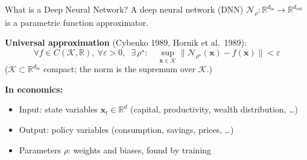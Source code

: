 \documentclass[aspectratio=169,11pt]{beamer}
\newcommand{\emphc}[1]{\textcolor{harvardcrimson}{#1}}
\newcommand{\x}{\bm{x}}
\newcommand{\R}{\mathbb{R}}
\begin{document}
\begin{frame}{What is a Deep Neural Network?}
A deep neural network (DNN) $\mathcal{N}_\rho : \R^{d_{\text{in}}} \to \R^{d_{\text{out}}}$ is a \emphc{parametric function approximator}.

\vspace{0.5em}
\textbf{Universal approximation} (Cybenko 1989, Hornik et al.\ 1989):
\[
\forall f \in C(\mathcal{K},\R),\ \forall\varepsilon > 0,\;\; \exists\, \rho^\star : \quad \sup_{\x\in\mathcal{K}}\bigl\|\mathcal{N}_{\rho^\star}(\x) - f(\x)\bigr\| < \varepsilon
\]
{\scriptsize ($\mathcal{K}\subset\R^{d_{\mathrm{in}}}$ compact; the norm is the supremum over $\mathcal{K}$.)}

\vspace{0.5em}
\textbf{In economics:}
\begin{itemize}
    \item \emphc{Input:} state variables $\x_t \in \R^{d}$ (capital, productivity, wealth distribution, \ldots)
    \item \emphc{Output:} policy variables (consumption, savings, prices, \ldots)
    \item \emphc{Parameters} $\rho$: weights and biases, found by \emphc{training}
\end{itemize}
\end{frame}
\end{document}
